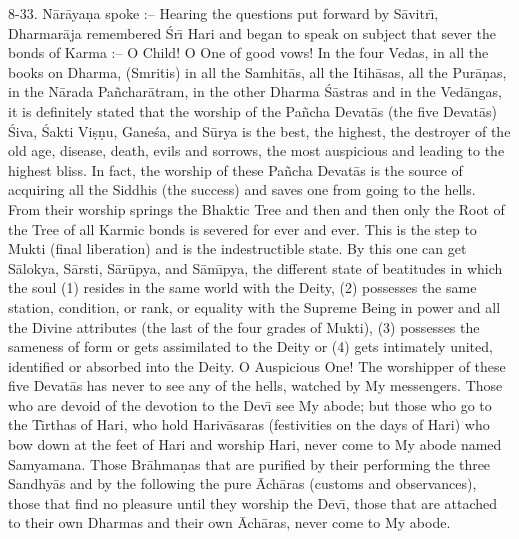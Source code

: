 8-33. N\=ar\=aya\d{n}a spoke :-- Hearing the questions put forward by S\=avitr\={\i}, Dharmar\=aja remembered \'Sr\={\i} Hari and began to speak on subject that sever the bonds of Karma :-- O Child! O One of good vows! In the four Vedas, in all the books on Dharma, (Smritis) in all the Samhit\=as, all the Itih\=asas, all the Pur\=a\d{n}as, in the N\=arada Pa\~nchar\=atram, in the other Dharma \'S\=astras and in the Ved\=angas, it is definitely stated that the worship of the Pa\~ncha Devat\=as (the five Devat\=as) \'Siva, \'Sakti Vi\d{s}\d{n}u, Gane\'sa, and S\=urya is the best, the highest, the destroyer of the old age, disease, death, evils and sorrows, the most auspicious and leading to the highest bliss. In fact, the worship of these Pa\~ncha Devat\=as is the source of acquiring all the Siddhis (the success) and saves one from going to the hells. From their worship springs the Bhaktic Tree and then and then only the Root of the Tree of all Karmic bonds is severed for ever and ever. This is the step to Mukti (final liberation) and is the indestructible state. By this one can get S\=alokya, S\=arsti, S\=ar\=upya, and S\=am\={\i}pya, the different state of beatitudes in which the soul (1) resides in the same world with the Deity, (2) possesses the same station, condition, or rank, or equality with the Supreme Being in power and all the Divine attributes (the last of the four grades of Mukti), (3) possesses the sameness of form or gets assimilated to the Deity or (4) gets intimately united, identified or absorbed into the Deity. O Auspicious One! The worshipper of these five Devat\=as has never to see any of the hells, watched by My messengers. Those who are devoid of the devotion to the Dev\={\i} see My abode; but those who go to the T\={\i}rthas of Hari, who hold Hariv\=asaras (festivities on the days of Hari) who bow down at the feet of Hari and worship Hari, never come to My abode named Samyamana. Those Br\=ahma\d{n}as that are purified by their performing the three Sandhy\=as and by the following the pure \=Ach\=aras (customs and observances), those that find no pleasure until they worship the Dev\={\i}, those that are attached to their own Dharmas and their own \=Ach\=aras, never come to My abode.

